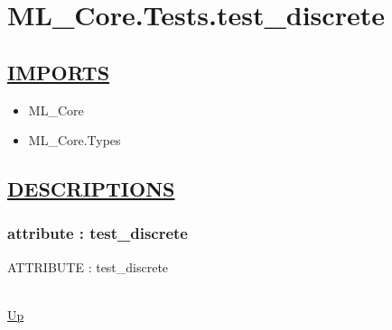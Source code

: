 \chapter*{ML\_Core.Tests.test\_discrete}
\hypertarget{ML_Core.Tests.test_discrete}{}

\section*{\underline{IMPORTS}}
\begin{itemize}
\item ML\_Core
\item ML\_Core.Types
\end{itemize}

\section*{\underline{DESCRIPTIONS}}
\subsection*{attribute : test\_discrete}
\hypertarget{ecldoc:ml_core.tests.test_discrete}{ATTRIBUTE : test\_discrete} \\
\hyperlink{ecldoc:}{Up} \\
\par
